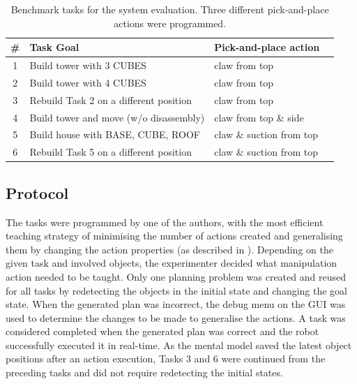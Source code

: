 \begin{table}[t]
\begin{center}
\caption{Benchmark tasks for the system evaluation. Three different pick-and-place actions were programmed.}
\label{table:task-list}
\begin{tabular}{clll}
\# & Task Goal & Pick-and-place action\\ \hline
1 & Build tower with 3 CUBES & claw from top \\
2 & Build tower with 4 CUBES & claw from top \\
3 & Rebuild Task 2 on a different position & claw from top \\
4 & Build tower and move (w/o disassembly) & claw from top \& side \\
5 & Build house with BASE, CUBE, ROOF & claw \& suction from top \\
6 & Rebuild Task 5 on a different position & claw \& suction from top \\
\end{tabular}
\end{center}
\end{table}

\subsection{Protocol}
The tasks were programmed by one of the authors, with the most efficient teaching strategy of minimising the number of actions created and generalising them by changing the action properties (as described in ).
Depending on the given task and involved objects, the experimenter decided what manipulation action needed to be taught.
Only one planning problem was created and reused for all tasks by redetecting the objects in the initial state and changing the goal state.
When the generated plan was incorrect, the debug menu on the GUI was used to determine the changes to be made to generalise the actions.
A task was considered completed when the generated plan was correct and the robot successfully executed it in real-time.
As the mental model saved the latest object positions after an action execution, Tasks 3 and 6 were continued from the preceding tasks and did not require redetecting the initial states. 

